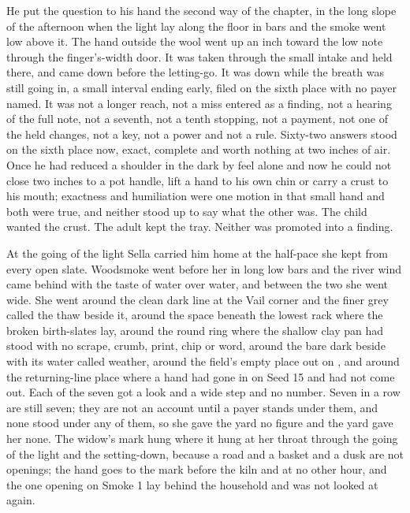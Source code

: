 \scenebreak

He put the question to his hand the second way of the chapter, in the long slope of the afternoon when the light lay along the floor in bars and the smoke went low above it. The hand outside the wool went up an inch toward the low note through the finger's-width door. It was taken through the small intake and held there, and came down before the letting-go. It was down while the breath was still going in, a small interval ending early, filed on the sixth place with no payer named. It was not a longer reach, not a miss entered as a finding, not a hearing of the full note, not a seventh, not a tenth stopping, not a payment, not one of the held changes, not a key, not a power and not a rule. Sixty-two answers stood on the sixth place now, exact, complete and worth nothing at two inches of air. Once he had reduced a shoulder in the dark by feel alone and now he could not close two inches to a pot handle, lift a hand to his own chin or carry a crust to his mouth; exactness and humiliation were one motion in that small hand and both were true, and neither stood up to say what the other was. The child wanted the crust. The adult kept the tray. Neither was promoted into a finding.

At the going of the light Sella carried him home at the half-pace she kept from every open slate. Woodsmoke went before her in long low bars and the river wind came behind with the taste of water over water, and between the two she went wide. She went around the clean dark line at the Vail corner and the finer grey called the thaw beside it, around the space beneath the lowest rack where the broken birth-slates lay, around the round ring where the shallow clay pan had stood with no scrape, crumb, print, chip or word, around the bare dark  beside  with its water called weather, around the field's empty place out on , and around the returning-line place where a hand had gone in on Seed 15 and had not come out. Each of the seven got a look and a wide step and no number. Seven in a row are still seven; they are not an account until a payer stands under them, and none stood under any of them, so she gave the yard no figure and the yard gave her none. The widow's mark hung where it hung at her throat through the going of the light and the setting-down, because a road and a basket and a dusk are not openings; the hand goes to the mark before the kiln and at no other hour, and the one opening on Smoke 1 lay behind the household and was not looked at again.

